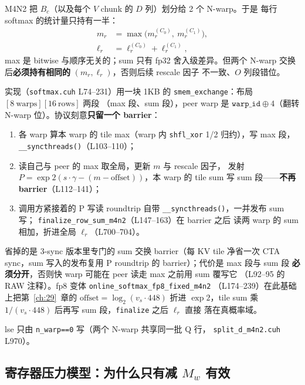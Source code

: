 M4N2 把 $B_c$（以及每个 $V$ chunk 的 $D$ 列）划分给 2 个 N-warp。于是
每行 softmax 的统计量只持有一半：
\begin{align}
m_r &= \max\bigl(m_r^{(C_0)},\ m_r^{(C_1)}\bigr),\label{eq:30-maxmerge}\\
\ell_r &= \ell_r^{(C_0)}+\ell_r^{(C_1)},\label{eq:30-summerge}
\end{align}
max 是 bitwise 与顺序无关的；sum 只有 fp32 舍入级差异。但两个 N-warp
交换后\textbf{必须持有相同的} $(m_r,\ell_r)$，否则后续 rescale 因子
不一致、$O$ 列段错位。

实现（\texttt{softmax.cuh} L74--231）用一块 1KB 的
\texttt{smem\_exchange}：布局 $[8\ \text{warps}][16\ \text{rows}]$ 两段
（max 段、sum 段），peer warp 是 $\texttt{warp\_id}\oplus 4$（翻转
N-warp 位）。协议刻意\textbf{只留一个 barrier}：

\begin{enumerate}[itemsep=0pt,topsep=2pt]
  \item 各 warp 算本 warp 的 tile max（warp 内 \texttt{shfl\_xor} 1/2
        归约），写 max 段，\texttt{\_\_syncthreads()}（L103--110）；
  \item 读自己与 peer 的 max 取全局，更新 $m$ 与 rescale 因子，
        发射 $P=\exp2(s\cdot\gamma-(m-\text{offset}))$，本 warp 的
        tile sum 写 sum 段——\textbf{不再 barrier}（L112--141）；
  \item 调用方紧接着的 P 写读 roundtrip 自带
        \texttt{\_\_syncthreads()}，一并发布 sum 写；
        \texttt{finalize\_row\_sum\_m4n2}（L147--163）在 barrier 之后
        读两 warp 的 sum 相加，折进全局 $\ell_r$（L700--704）。
\end{enumerate}

省掉的是 3-sync 版本里专门的 sum 交换 barrier（每 KV tile 净省一次
CTA sync，sum 写入的发布复用 P roundtrip 的 barrier）；代价是 max 段与 sum 段
\textbf{必须分开}，否则快 warp 可能在 peer 读走 max 之前用 sum 覆写它
（L92--95 的 RAW 注释）。fp8 变体 \texttt{online\_softmax\_fp8\_fixed\_m4n2}
（L174--239）在此基础上把第~\ref{ch:29}~章的
$\text{offset}=\log_2(v_s\cdot448)$ 折进 $\exp2$，tile sum 乘
$1/(v_s\cdot448)$ 后再写 sum 段，\texttt{finalize} 之后 $\ell_r$ 直接
落在真概率域。

lse 只由 \texttt{n\_warp==0} 写（两个 N-warp 共享同一批 Q 行，
\texttt{split\_d\_m4n2.cuh} L970）。

\subsection{寄存器压力模型：为什么只有减 $M_w$ 有效}\label{sec:30-regmodel}

